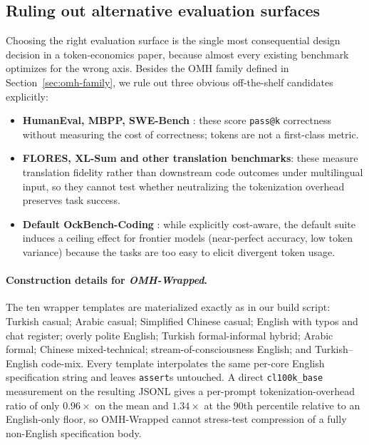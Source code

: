 \documentclass[11pt,a4paper,twocolumn]{article}
\begin{document}
\subsection{Ruling out alternative evaluation surfaces}
\label{sec:benchmark-selection}
Choosing the right evaluation surface is the single most consequential design decision in a token-economics paper, because almost every existing benchmark optimizes for the wrong axis. Besides the OMH family defined in Section~\ref{sec:omh-family}, we rule out three obvious off-the-shelf candidates explicitly:
\begin{itemize}
    \item \textbf{HumanEval, MBPP, SWE-Bench} \cite{jimenez2024swebench}: these score \texttt{pass@k} correctness without measuring the cost of correctness; tokens are not a first-class metric.
    \item \textbf{FLORES, XL-Sum and other translation benchmarks}: these measure translation fidelity rather than downstream code outcomes under multilingual input, so they cannot test whether neutralizing the tokenization overhead preserves task success.
    \item \textbf{Default OckBench-Coding} \cite{du2026ockbench}: while explicitly cost-aware, the default suite induces a ceiling effect for frontier models (near-perfect accuracy, low token variance) because the tasks are too easy to elicit divergent token usage.
\end{itemize}

\paragraph{Construction details for \textit{OMH-Wrapped}.}
The ten wrapper templates are materialized exactly as in our build script: Turkish casual; Arabic casual; Simplified Chinese casual; English with typos and chat register; overly polite English; Turkish formal-informal hybrid; Arabic formal; Chinese mixed-technical; stream-of-consciousness English; and Turkish--English code-mix. Every template interpolates the same per-core English specification string and leaves \texttt{assert}s untouched. A direct \texttt{cl100k\_base} measurement on the resulting JSONL gives a per-prompt tokenization-overhead ratio of only $0.96\times$ on the mean and $1.34\times$ at the $90$th percentile relative to an English-only floor, so OMH-Wrapped cannot stress-test compression of a fully non-English specification body.
\end{document}
